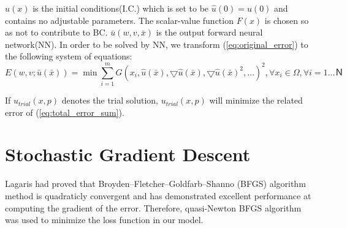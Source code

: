 \documentclass{article}
\begin{document}
$\hat{u}(x)$ is the initial conditions(I.C.) which is set to be $\hat{u}(0) = u (0)$ and contains no adjustable parameters.
The scalar-value function $F(x)$ is chosen so as not to contribute to BC.
$\bar{u}(w,v,\bar{x})$ is the output forward neural network(NN).
In order to be solved by NN, we transform (\ref{eq:original_error}) to the  following system of equations:
\begin{equation}\label{eq:total_error_sum}
E(w,v;\bar{u}(\bar{x})) = \min \sum_{i=1}^{m} G(x_i,\hat{u} (\bar{x}),\bigtriangledown \hat{u} (\bar{x}), \bigtriangledown \hat{u} (\bar{x})^2, \dots) ^2, \forall x_i \in \Omega, \forall i = 1 \dots Ｎ
\end{equation}

If $u_{trial}(x,p)$ denotes the trial solution, $u_{trial}(x,p)$ will minimize the related error of (\ref{eq:total_error_sum}). 



\section{Stochastic Gradient Descent}
Lagaris\cite{lagaris} had proved that Broyden–Fletcher–Goldfarb–Shanno (BFGS) algorithm method is quadraticly convergent and has demonstrated excellent performance at computing the gradient of the error.
Therefore, quasi-Newton BFGS algorithm was used to minimize the loss function in our model.
\end{document}
